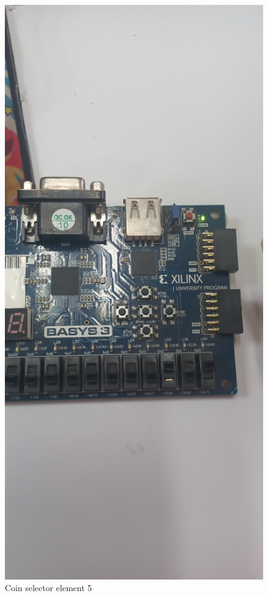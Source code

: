 \documentclass{article}
\begin{document}
\begin{multicols}{2}
	\begin{figure}[H]
		\centering
		\includegraphics[width=1\linewidth]{images/diagrams/coin-selector/coin-selector5.jpg}
		\caption{Coin selector element 5}
		\label{Coin selector element 5 Apendix}
	\end{figure}


\end{multicols}
\end{document}

